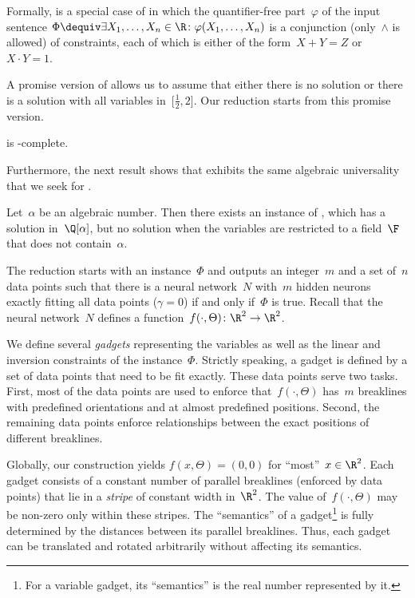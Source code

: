 \documentclass{toc}
\begin{document}
Formally, \ETRINV is a special case of \ETR in which the quantifier-free part~$\varphi$ of the input sentence \(
    \Phi \dequiv
    \exists X_1, \ldots, X_n \in \R \colon
    \varphi(X_1, \ldots, X_n)
\) is a conjunction (only~$\land$ is allowed) of constraints, each of which is either of the form~$X + Y = Z$ or~$X \cdot Y = 1$.

A promise version of \ETRINV allows us to assume that
%
either there is no solution or there is a solution  %
with all variables in~$\bigl[\frac{1}{2},2\bigr]$.
%
%
%
%
Our reduction starts from this promise version.


\begin{theorem}
    \label{thm:ETRINV}
    \ETRINV is \ER-complete.
\end{theorem}

Furthermore, 
the next result shows that %
\ETRINV exhibits the same algebraic universality that we seek
for \trainNN. %

\begin{theorem}
    \label{thm:ETRINV_universality}
    Let~$\alpha$ be an algebraic number.
    Then there exists an instance of \ETRINV, which has a solution in~$\Q[\alpha]$, but no solution when the variables are restricted to a field~$\F$ that does not contain~$\alpha$.
\end{theorem}

The reduction starts with an \ETRINV instance~$\Phi$ and outputs an integer~$m$ and a set of~$n$ data points such that there is a \fullyconnected \twolayer \ReLU neural network~$N$ with~$m$ hidden neurons exactly fitting all data points ($\gamma = 0$) if and only if~$\Phi$ is true.
Recall that the neural network~$N$ defines a \CPWL function~$f(\cdot, \Theta) \colon \R^2 \to \R^2$.

We define several \emph{gadgets} representing the variables as well as the linear and inversion constraints of the \ETRINV instance~$\Phi$.
Strictly speaking, a gadget is defined by a set of data points that need to be fit exactly.
These data points serve two tasks. %
%
%
First,  %
most of the data points are used to enforce that~$f(\cdot, \Theta)$ has~$m$ breaklines
with predefined orientations and at almost predefined positions.
%
Second,  %
the remaining data points enforce relationships between the exact positions of different
breaklines.

Globally, our construction yields $f(x, \Theta) = (0,0)$ for \enquote{most}~$x \in \R^2$.
Each gadget consists of a constant number of parallel breaklines (enforced by data points)
that lie in a \emph{stripe} of constant width in~$\R^2$.
The value of~$f(\cdot, \Theta)$ may be non-zero only within these stripes.
The \enquote{semantics} of a gadget\footnote{
For a variable gadget, its \enquote{semantics} is the real number represented by it.} 
is fully determined by the distances between its parallel breaklines.
Thus, each gadget can be translated and rotated arbitrarily without affecting its semantics.
\end{document}
